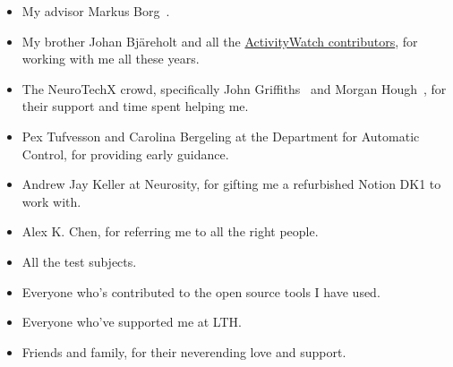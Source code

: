 \begin{itemize}
 \item My advisor Markus Borg~.
 \item My brother Johan Bjäreholt and all the \href{https://activitywatch.net/contributors/}{ActivityWatch contributors}, for working with me all these years.
 \item The NeuroTechX crowd, specifically John Griffiths~ and Morgan Hough~, for their support and time spent helping me.
 \item Pex Tufvesson and Carolina Bergeling at the Department for Automatic Control, for providing early guidance.
 \item Andrew Jay Keller at Neurosity, for gifting me a refurbished Notion DK1 to work with.
 \item Alex K. Chen, for referring me to all the right people.
 \item All the test subjects.
 \item Everyone who's contributed to the open source tools I have used.
 \item Everyone who've supported me at LTH\@.
 \item Friends and family, for their neverending love and support.
\end{itemize}
